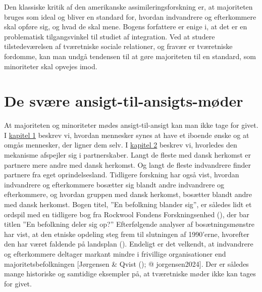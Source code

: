 \documentclass[
]{book}
\begin{document}
Den klassiske kritik af den amerikanske assimileringsforskning er, at majoriteten bruges som ideal og bliver en standard for, hvordan indvandrere og efterkommere skal opføre sig, og hvad de skal mene. Bogens forfattere er enige i, at det er en problematisk tilgangsvinkel til studiet af integration. Ved at studere tilstedeværelsen af tværetniske sociale relationer, og fravær er tværetniske fordomme, kan man undgå tendensen til at gøre majoriteten til en standard, som minoriteter skal opvejes imod.

\section{De svære ansigt-til-ansigts-møder}\label{de-svuxe6re-ansigt-til-ansigts-muxf8der}

At majoriteten og minoriteter mødes ansigt-til-ansigt kan man ikke tage for givet. I \hyperref[kap1]{kapitel 1} beskrev vi, hvordan mennesker synes at have et iboende ønske og at omgås mennesker, der ligner dem selv. I \hyperref[kap2]{kapitel 2} beskrev vi, hvorledes den mekanisme afspejler sig i partnerskaber. Langt de fleste med dansk herkomst er partnere mere andre med dansk herkomst. Og langt de fleste indvandrere finder partnere fra eget oprindelsesland. Tidligere forskning har også vist, hvordan indvandrere og efterkommere bosætter sig blandt andre indvandrere og efterkommere, og hvordan gruppen med dansk herkomst, bosætter blandt andre med dansk herkomst. Bogen titel, ''En befolkning blander sig'', er således lidt et ordspil med en tidligere bog fra Rockwool Fondens Forskningsenhed (), der bar titlen ''En befolkning deler sig op?'' Efterfølgende analyser af bosætningsmønstre har vist, at den etniske opdeling steg frem til slutningen af 1990'erne, hvorefter den har været faldende på landsplan (). Endeligt er det velkendt, at indvandrere og efterkommere deltager markant mindre i frivillige organisationer end majoritetsbefolkningen {[}Jørgensen \& Qvist (); @ jorgensen2024{]}. Der er således mange historiske og samtidige eksempler på, at tværetniske møder ikke kan tages for givet.
\end{document}
